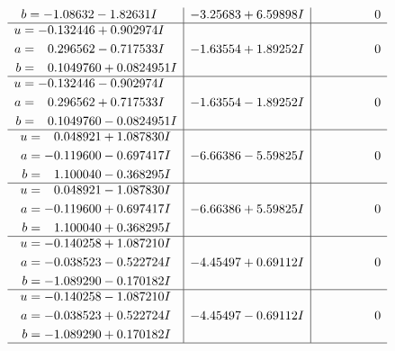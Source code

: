\documentclass[1p]{elsarticle_modified}
\theoremstyle{definition}
\begin{document}
$$\begin{array}{c|c|c}
\begin{aligned}
b &= -1.08632 - 1.82631 I\end{aligned}
 & -3.25683 + 6.59898 I & \phantom{-0.000000 } 0 \\ \hline\begin{aligned}
u &= -0.132446 + 0.902974 I \\
a &= \phantom{-}0.296562 - 0.717533 I \\
b &= \phantom{-}0.1049760 + 0.0824951 I\end{aligned}
 & -1.63554 + 1.89252 I & \phantom{-0.000000 } 0 \\ \hline\begin{aligned}
u &= -0.132446 - 0.902974 I \\
a &= \phantom{-}0.296562 + 0.717533 I \\
b &= \phantom{-}0.1049760 - 0.0824951 I\end{aligned}
 & -1.63554 - 1.89252 I & \phantom{-0.000000 } 0 \\ \hline\begin{aligned}
u &= \phantom{-}0.048921 + 1.087830 I \\
a &= -0.119600 - 0.697417 I \\
b &= \phantom{-}1.100040 - 0.368295 I\end{aligned}
 & -6.66386 - 5.59825 I & \phantom{-0.000000 } 0 \\ \hline\begin{aligned}
u &= \phantom{-}0.048921 - 1.087830 I \\
a &= -0.119600 + 0.697417 I \\
b &= \phantom{-}1.100040 + 0.368295 I\end{aligned}
 & -6.66386 + 5.59825 I & \phantom{-0.000000 } 0 \\ \hline\begin{aligned}
u &= -0.140258 + 1.087210 I \\
a &= -0.038523 - 0.522724 I \\
b &= -1.089290 - 0.170182 I\end{aligned}
 & -4.45497 + 0.69112 I & \phantom{-0.000000 } 0 \\ \hline\begin{aligned}
u &= -0.140258 - 1.087210 I \\
a &= -0.038523 + 0.522724 I \\
b &= -1.089290 + 0.170182 I\end{aligned}
 & -4.45497 - 0.69112 I & \phantom{-0.000000 } 0\\
 \hline 
 \end{array}$$\newpage$$\begin{array}{c|c|c}  

\end{array}$$
\end{document}
